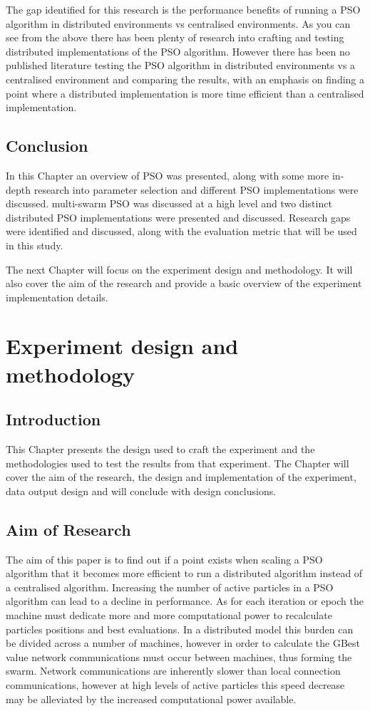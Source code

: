 \documentclass[oneside,12pt]{book}
\begin{document}
The gap identified for this research is the performance benefits of running a PSO algorithm in distributed environments vs centralised environments. As you can see from the above there has been plenty of research into crafting and testing distributed implementations of the PSO algorithm. However there has been no published literature testing the PSO algorithm in distributed environments vs a centralised environment and comparing the results, with an emphasis on finding a point where a distributed implementation is more time efficient than a centralised implementation. 

\section{Conclusion}
In this Chapter an overview of PSO was presented, along with some more in-depth research into parameter selection and different PSO implementations were discussed. multi-swarm PSO was discussed at a high level and two distinct distributed PSO implementations were presented and discussed.
Research gaps were identified and discussed, along with the evaluation metric that will be used in this study. 

The next Chapter will focus on the experiment design and methodology. It will also cover the aim of the research and provide a basic overview of the experiment implementation details.


\chapter{Experiment design and methodology}
\section{Introduction}
This Chapter presents the design used to craft the experiment and the methodologies used to test the results from that experiment. The Chapter will cover the aim of the research, the design and implementation of the experiment, data output design and will conclude with design conclusions. 
\section{Aim of Research}
The aim of this paper is to find out if a point exists when scaling a PSO algorithm that it becomes more efficient to run a distributed algorithm instead of a centralised algorithm. Increasing the number of active particles in a PSO algorithm can lead to a decline in performance. As for each iteration or epoch the machine must dedicate more and more computational power to recalculate particles positions and best evaluations. In a distributed model this burden can be divided across a number of machines, however in order to calculate the GBest value network communications must occur between machines, thus forming the swarm. Network communications are inherently slower than local connection communications, however at high levels of active particles this speed decrease may be alleviated by the increased computational power available. 
\end{document}
